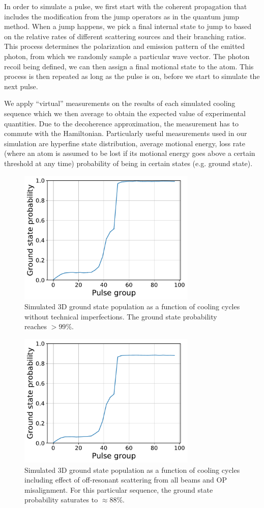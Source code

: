 \documentclass[aps,twocolumn,secnumarabic,amsmath,amssymb]{revtex4}
\begin{document}
In order to simulate a pulse, we first start with the coherent propagation that includes the
modification from the jump operators as in the quantum jump method.
When a jump happens, we pick a final internal state to jump to based on the relative rates
of different scattering sources and their branching ratios.
This process determines the polarization and emission pattern of the emitted photon,
from which we randomly sample a particular wave vector.
The photon recoil being defined, we can then assign a final motional state to the atom.
This process is then repeated as long as the pulse is on,
before we start to simulate the next pulse.

We apply ``virtual'' measurements on the results of each simulated cooling sequence
which we then average to obtain the expected value of experimental quantities.
Due to the decoherence approximation, the measurement has to commute with the Hamiltonian.
Particularly useful measurements used in our simulation are hyperfine state distribution,
average motional energy, loss rate (where an atom is assumed to be lost if its motional energy
goes above a certain threshold at any time) probability of being in certain states
(e.g. ground state).

\begin{figure}[t]
  \includegraphics[width=8.5cm]{imgs/simcool_no_scatter.pdf}
  \caption{Simulated 3D ground state population as a function of cooling cycles without
    technical imperfections. The ground state probability reaches $>99\%$. \label{f-no-scatter}}
\end{figure}
\begin{figure}[t]
  \includegraphics[width=8.5cm]{imgs/simcool_real.pdf}
  \caption{Simulated 3D ground state population as a function of cooling cycles including effect of
    off-resonant scattering from all beams and OP misalignment.
    For this particular sequence, the ground state probability saturates to $\approx88\%$.
    \label{f-real}}
\end{figure}
\end{document}
